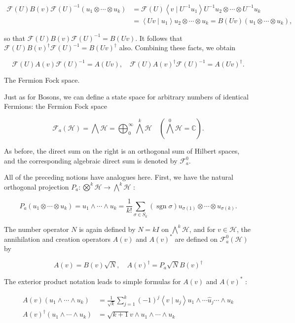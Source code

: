 \documentclass[10pt, letterpaper]{article}
\begin{document}
$$
\begin{aligned}
\mathcal{F}(U) B(v) \mathcal{F}(U)^{-1}\left(u_{1} \otimes \cdots \otimes u_{k}\right) & =\mathcal{F}(U)\left\langle v \mid U^{-1} u_{1}\right\rangle U^{-1} u_{2} \otimes \cdots \otimes U^{-1} u_{k} \\
& =\left\langle U v \mid u_{1}\right\rangle u_{2} \otimes \cdots \otimes u_{k}=B(U v)\left(u_{1} \otimes \cdots \otimes u_{k}\right),
\end{aligned}
$$

so that $\mathcal{F}(U) B(v) \mathcal{F}(U)^{-1}=B(U v)$. It follows that $\mathcal{F}(U) B(v)^{\dagger} \mathcal{F}(U)^{-1}=B(U v)^{\dagger}$ also. Combining these facts, we obtain

$$
\mathcal{F}(U) A(v) \mathcal{F}(U)^{-1}=A(U v), \quad \mathcal{F}(U) A(v)^{\dagger} \mathcal{F}(U)^{-1}=A(U v)^{\dagger} .
$$


\pagebreak


The Fermion Fock space. 

Just as for Bosons, we can define a state space for arbitrary numbers of identical Fermions: the Fermion Fock space

$$
\mathcal{F}_{a}(\mathcal{H})=\bigwedge \mathcal{H}=\bigoplus_{0}^{\infty} \bigwedge^{k} \mathcal{H} \quad\left(\bigwedge^{0} \mathcal{H}=\mathbb{C}\right) .
$$

As before, the direct sum on the right is an orthogonal sum of Hilbert spaces, and the corresponding algebraic direct sum is denoted by $\mathcal{F}_{a}^{0}$.

All of the preceding notions have analogues here. First, we have the natural orthogonal projection $P_{a}: \bigotimes^{k} \mathcal{H} \rightarrow \bigwedge^{k} \mathcal{H}$ :

$$
P_{a}\left(u_{1} \otimes \cdots \otimes u_{k}\right)=u_{1} \wedge \cdots \wedge u_{k}=\frac{1}{k!} \sum_{\sigma \in S_{k}}(\operatorname{sgn} \sigma) u_{\sigma(1)} \otimes \cdots \otimes u_{\sigma(k)} .
$$

The number operator $N$ is again defined by $N=k I$ on $\bigwedge^{k} \mathcal{H}$, and for $v \in \mathcal{H}$, the annihilation and creation operators $A(v)$ and $A(v)^{*}$ are defined on $\mathcal{F}_{a}^{0}(\mathcal{H})$ by

$$
A(v)=B(v) \sqrt{N}, \quad A(v)^{\dagger}=P_{a} \sqrt{N} B(v)^{\dagger}
$$

The exterior product notation leads to simple formulas for $A(v)$ and $A(v)^{*}$ :

$$
\begin{aligned}
A(v)\left(u_{1} \wedge \cdots \wedge u_{k}\right) & =\frac{1}{\sqrt{k}} \sum_{j=1}^{k}(-1)^{j}\left\langle v \mid u_{j}\right\rangle u_{1} \wedge \cdots \widehat{u}_{j} \cdots \wedge u_{k} \\
A(v)^{\dagger}\left(u_{1} \wedge \cdots \wedge u_{k}\right) & =\sqrt{k+1} v \wedge u_{1} \wedge \cdots \wedge u_{k}
\end{aligned}
$$
\end{document}

